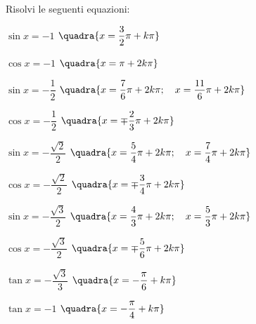 \begin{esercizio}\label{ese:03.1}
Risolvi le seguenti equazioni:
 \begin{enumeratea}
  \item $\sin x = -1$
   \hfill $\quadra{x = \dfrac{3}{2}\pi + k \pi}$
  \item $\cos x = -1$
   \hfill $\quadra{x = \pi + 2k \pi}$
  \item $\sin x = -\dfrac{1}{2}$
   \hfill $\quadra{x = \dfrac{7}{6}\pi + 2k \pi; \quad
                   x = \dfrac{11}{6}\pi + 2k \pi}$
  \item $\cos x = -\dfrac{1}{2}$
   \hfill $\quadra{x = \mp \dfrac{2}{3}\pi + 2k \pi}$
  \item $\sin x = -\dfrac{\sqrt{2}}{2}$
   \hfill $\quadra{x = \dfrac{5}{4}\pi + 2k \pi; \quad
                   x = \dfrac{7}{4}\pi + 2k \pi}$
  \item $\cos x = -\dfrac{\sqrt{2}}{2}$
   \hfill $\quadra{x = \mp \dfrac{3}{4}\pi + 2k \pi}$
  \item $\sin x = -\dfrac{\sqrt{3}}{2}$
   \hfill $\quadra{x = \dfrac{4}{3}\pi + 2k \pi; \quad
                   x = \dfrac{5}{3}\pi + 2k \pi}$
  \item $\cos x = -\dfrac{\sqrt{3}}{2}$
   \hfill $\quadra{x = \mp \dfrac{5}{6}\pi + 2k \pi}$
  \item $\tan x = -\dfrac{\sqrt{3}}{3}$
   \hfill $\quadra{x = -\dfrac{\pi}{6} + k \pi}$
  \item $\tan x = -1$
   \hfill $\quadra{x = -\dfrac{\pi}{4} + k \pi}$
 \end{enumeratea}
\end{esercizio}

